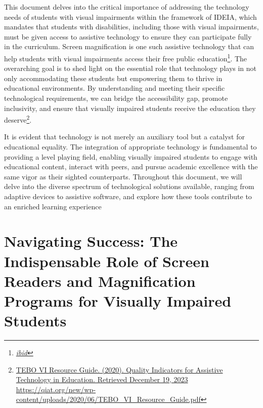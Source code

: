 \documentclass[12pt,letterpaper,twoside,openright]{report}
\begin{document}
This document delves into the critical importance of addressing the technology needs of students with visual impairments within the framework of IDEIA, which mandates that students with disabilities, including those with visual impairments, must be given access to assistive technology to ensure they can participate fully in the curriculum. Screen magnification is one such assistive technology that can help students with visual impairments access their free public education\footnote{\raggedright \href{http://sites.ed.gov/idea/statuteregulations/}{\textit{ibid}}}. The overarching goal is to shed light on the essential role that technology plays in not only accommodating these students but empowering them to thrive in educational environments. By understanding and meeting their specific technological requirements, we can bridge the accessibility gap, promote inclusivity, and ensure that visually impaired students receive the education they deserve\footnote{\raggedright \href{https://qiat.org/new/wp-content/uploads/2020/06/TEBO_VI_Resource_Guide.pdf}{TEBO VI Resource Guide. (2020). Quality Indicators for Assistive Technology in Education. Retrieved December 19, 2023} \url{https://qiat.org/new/wp-content/uploads/2020/06/TEBO_VI_Resource_Guide.pdf}}.

It is evident that technology is not merely an auxiliary tool but a catalyst for educational equality. The integration of appropriate technology is fundamental to providing a level playing field, enabling visually impaired students to engage with educational content, interact with peers, and pursue academic excellence with the same vigor as their sighted counterparts. Throughout this document, we will delve into the diverse spectrum of technological solutions available, ranging from adaptive devices to assistive software, and explore how these tools contribute to an enriched learning experience

\pagebreak
\fancyhead[RO]{\textit{\lastxmark}}
\fancyhead[LE]{\textit{\firstxmark}}
\fancyfoot[C]{}

\hypertarget{vision-assistive-technology-laptop-computer-requirements}{}\chapter[\raggedright Navigating Success:\hfill\break The Indispensable Role of Screen Readers and Magnification\hfill\break Programs for Visually Impaired Students]{Navigating Success: The Indispensable Role of Screen Readers and Magnification Programs for Visually Impaired Students}\label{vision-assistive-technology-laptop-computer-requirements}
\minitoc \newpage
\end{document}

